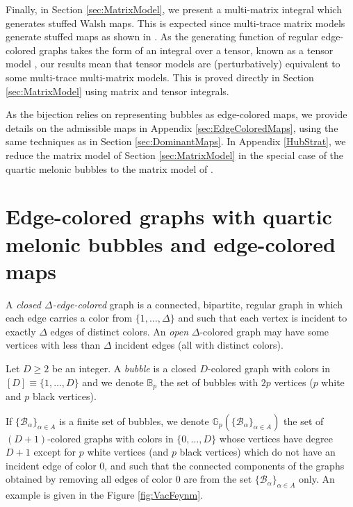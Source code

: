 \documentclass[aps,prd,10pt,notitlepage,nofootinbib,superscriptaddress,showkeys,showpacs]{revtex4-1}
\begin{document}
Finally, in Section \ref{sec:MatrixModel}, we present a multi-matrix integral which generates stuffed Walsh maps. This is expected since multi-trace matrix models generate stuffed maps as shown in \cite{Stuffed}. As the generating function of regular edge-colored graphs takes the form of an integral over a tensor, known as a tensor model \cite{Uncolored}, our results mean that tensor models are (perturbatively) equivalent to some multi-trace multi-matrix models. This is proved directly in Section \ref{sec:MatrixModel} using matrix and tensor integrals.

As the bijection relies on representing bubbles as edge-colored maps, we provide details on the admissible maps in Appendix \ref{sec:EdgeColoredMaps}, using the same techniques as in Section \ref{sec:DominantMaps}. In Appendix \ref{HubStrat},  we reduce the matrix model of Section \ref{sec:MatrixModel} in the special case of the quartic melonic bubbles to the matrix model of \cite{BeyondPert}.

\section{Edge-colored graphs with quartic melonic bubbles and edge-colored maps} \label{sec:Review}

A \emph{closed $\Delta$-edge-colored} graph is a connected, bipartite, regular graph in which each edge carries a color from $\{1, \dotsc, \Delta\}$ and such that each vertex is incident to exactly $\Delta$ edges of distinct colors. An \emph{open} $\Delta$-colored graph may have some vertices with less than $\Delta$ incident edges (all with distinct colors).

Let $D\geq 2$ be an integer. A \emph{bubble} is a closed $D$-colored graph with colors in $[D]\equiv \{1, \dotsc, D\}$ and we denote ${\mathbb{B}}_p$ the set of bubbles with $2p$ vertices ($p$ white and $p$ black vertices).

If $\{{\mathcal{B}}_\alpha\}_{\alpha\in A}$ is a finite set of bubbles, we denote ${\mathbb{G}}_p(\{{\mathcal{B}}_\alpha\}_{\alpha\in A})$ the set of $(D+1)$-colored graphs with colors in $\{0, \dotsc, D\}$ whose vertices have degree $D+1$ except for $p$ white vertices (and $p$ black vertices) which do not have an incident edge of color 0, and such that the connected components of the graphs obtained by removing all edges of color 0 are from the set $\{{\mathcal{B}}_\alpha\}_{\alpha\in A}$ only. An example is given in the Figure \ref{fig:VacFeynm}.
\end{document}
